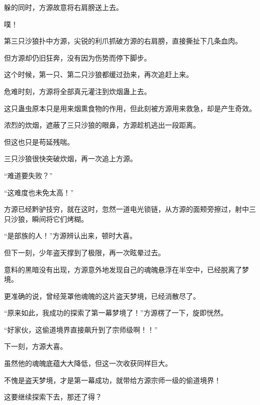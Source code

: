 \begin{this_body}
躲的同时，方源故意将右肩膀送上去。

噗！

第三只沙狼扑中方源，尖锐的利爪抓破方源的右肩膀，直接撕扯下几条血肉。

但方源却仍旧狂奔，没有因为伤势而停下脚步。

这个时候，第一只、第二只沙狼都缓过劲来，再次追赶上来。

危难时刻，方源将全部真元灌注到炊烟蛊上去。

这只蛊虫原本只是用来烟熏食物的作用，但此刻被方源用来救急，却是产生奇效。

浓烈的炊烟，遮蔽了三只沙狼的眼鼻，方源趁机逃出一段距离。

但这也只是苟延残喘。

三只沙狼很快突破炊烟，再一次追上方源。

“难道要失败？”

“这难度也未免太高！”

方源已经黔驴技穷，就在这时，忽然一道电光锁链，从方源的面颊旁擦过，射中三只沙狼，瞬间将它们烤糊。

“是部族的人！”方源辨认出来，顿时大喜。

但下一刻，少年盗天撑到了极限，再一次眩晕过去。

意料的黑暗没有出现，方源意外地发现自己的魂魄悬浮在半空中，已经脱离了梦境。

更准确的说，曾经笼罩他魂魄的这片盗天梦境，已经消散尽了。

“原来如此，我成功的探索了第一幕梦境了！”方源楞了一下，旋即恍然。

“好家伙，这偷道境界直接飙升到了宗师级啊！！”

下一刻，方源大喜。

虽然他的魂魄底蕴大大降低，但这一次收获同样巨大。

不愧是盗天梦境，才是第一幕成功，就带给方源宗师一级的偷道境界！

这要继续探索下去，那还了得？

\end{this_body}

